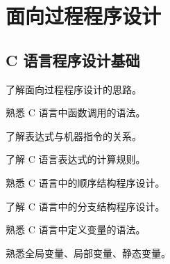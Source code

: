 
\part{面向过程程序设计}

\chapter{C 语言程序设计基础}

\begin{introduction}
	\item 了解面向过程程序设计的思路。
	\item 熟悉 C 语言中函数调用的语法。
	\item 了解表达式与机器指令的关系。
	\item 了解 C 语言表达式的计算规则。
	\item 熟悉 C 语言中的顺序结构程序设计。
	\item 了解 C 语言中的分支结构程序设计。
	\item 熟悉 C 语言中定义变量的语法。
	\item 熟悉全局变量、局部变量、静态变量。
\end{introduction}
